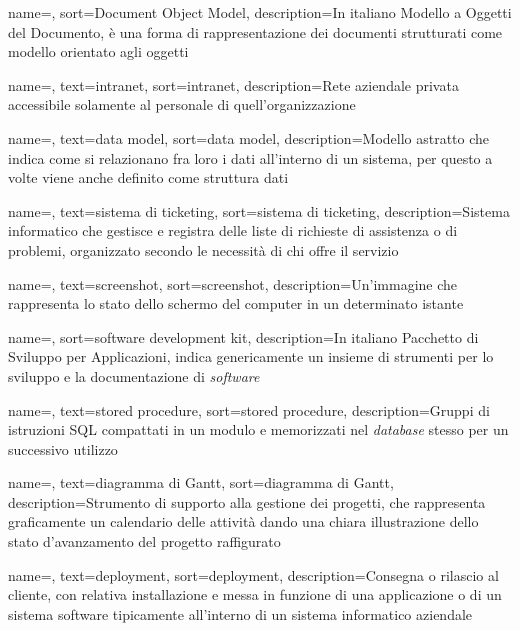 {
    name=,
    sort=Document Object Model,
    description={In italiano Modello a Oggetti del Documento, è una forma di rappresentazione dei documenti strutturati come modello orientato agli oggetti}
}

{
    name=,
    text=intranet,
    sort=intranet,
    description={Rete aziendale privata accessibile solamente al personale di quell'organizzazione}
}

{
    name=,
    text=data model,
    sort=data model,
    description={Modello astratto che indica come si relazionano fra loro i dati all'interno di un sistema, per questo a volte viene anche definito come struttura dati}
}

{
    name=,
    text=sistema di ticketing,
    sort=sistema di ticketing,
    description={Sistema informatico che gestisce e registra delle liste di richieste di assistenza o di problemi, organizzato secondo le necessità di chi offre il servizio}
}

{
    name=,
    text=screenshot,
    sort=screenshot,
    description={Un'immagine che rappresenta lo stato dello schermo del computer in un determinato istante}
}

{
    name=,
    sort=software development kit,
    description={In italiano Pacchetto di Sviluppo per Applicazioni, indica genericamente un insieme di strumenti per lo sviluppo e la documentazione di \textit{software}}
}

{
    name=,
    text=stored procedure,
    sort=stored procedure,
    description={Gruppi di istruzioni SQL compattati in un modulo e memorizzati nel \textit{database} stesso per un successivo utilizzo}
}

{
    name=,
    text=diagramma di Gantt,
    sort=diagramma di Gantt,
    description={Strumento di supporto alla gestione dei progetti, che rappresenta graficamente un calendario delle attività dando una chiara illustrazione dello stato d'avanzamento del progetto raffigurato}
}

{
    name=,
    text=deployment,
    sort=deployment,
    description={Consegna o rilascio al cliente, con relativa installazione e messa
in funzione di una applicazione o di un sistema software tipicamente all'interno di un sistema informatico aziendale}
}
